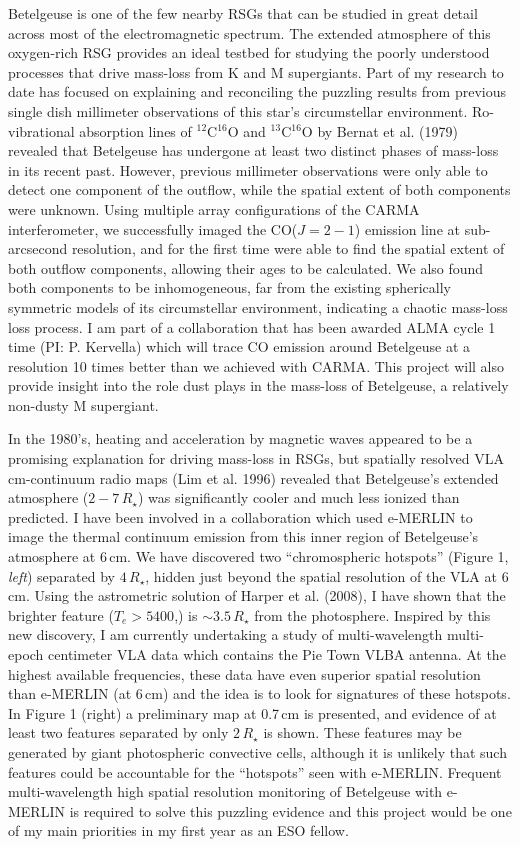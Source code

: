 \documentclass[11pt]{letter} %
\begin{document}
Betelgeuse is one of the few nearby RSGs that can be studied in great detail across most of the electromagnetic spectrum. The extended atmosphere of this oxygen-rich RSG provides an ideal testbed for studying the poorly understood processes that drive mass-loss from K and M supergiants. Part of my research to date has focused on explaining and reconciling the puzzling results from previous single dish millimeter observations of this star's circumstellar environment. Ro-vibrational absorption lines of $^{12}$C$^{16}$O and $^{13}$C$^{16}$O by Bernat et al. (1979) revealed that Betelgeuse has undergone at least two distinct phases of mass-loss in its recent past. However, previous millimeter observations were only able to detect one component of the outflow, while the spatial extent of both components were unknown. Using multiple array configurations of the CARMA interferometer, we successfully imaged the CO($J = 2 - 1$) emission line at sub-arcsecond resolution, and for the first time were able to find the spatial extent of both outflow components, allowing their ages to be calculated. We also found both components to be inhomogeneous, far from the existing spherically symmetric models of its circumstellar environment, indicating a chaotic mass-loss loss process. I am part of a collaboration that has been awarded ALMA cycle 1 time (PI: P. Kervella) which will trace CO emission around Betelgeuse at a resolution 10 times better than we achieved with CARMA. This project will also provide insight into the role dust plays in the mass-loss of Betelgeuse, a relatively non-dusty M supergiant.

In the 1980's, heating and acceleration by magnetic waves appeared to be a promising explanation for driving mass-loss in RSGs, but spatially resolved VLA cm-continuum radio maps (Lim et al. 1996) revealed that Betelgeuse's extended atmosphere ($2-7\,R_{\star}$) was significantly cooler and much less ionized than predicted. I have been involved in a collaboration which used e-MERLIN to image the thermal continuum emission from this inner region of Betelgeuse's atmosphere at 6\,cm. We have discovered two ``chromospheric hotspots'' (Figure 1, \textit{left}) separated by $4\,R_{\star}$, hidden just beyond the spatial resolution of the VLA at 6\,cm. Using the astrometric solution of Harper et al. (2008), I have shown that the brighter feature ($T_{e} > 5400$,\K) is $\sim 3.5\,R_{\star}$ from the photosphere. Inspired by this new discovery, I am currently undertaking a study of multi-wavelength multi-epoch centimeter VLA data which contains the Pie Town VLBA antenna. At the highest available frequencies, these data have even superior spatial resolution than e-MERLIN (at 6\,cm) and the idea is to look for signatures of these hotspots. In Figure 1 (right) a preliminary map at 0.7\,cm is presented, and evidence of at least two features separated by only $2\,R_{\star}$ is shown. These features may be generated by  giant photospheric convective cells, although it is unlikely that such features could be accountable for the ``hotspots'' seen with e-MERLIN. Frequent multi-wavelength high spatial resolution monitoring of Betelgeuse with e-MERLIN is required to solve this puzzling evidence and this project would be one of my main priorities in my first year as an ESO fellow.
\end{document}
